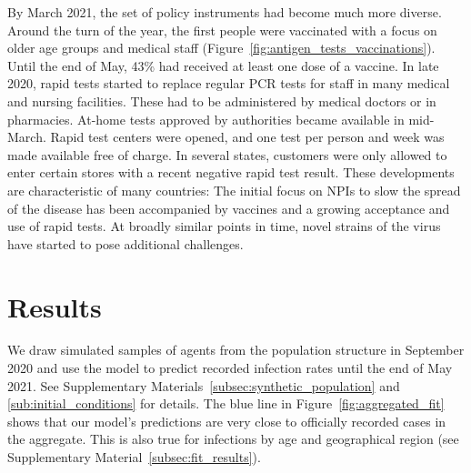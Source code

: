 \begin{figure}[!tp]
\end{figure}

By March 2021, the set of policy instruments had become much more diverse. Around the
turn of the year, the first people were vaccinated with a focus on older age groups and
medical staff (Figure~\ref{fig:antigen_tests_vaccinations}). Until the end of May, 43\%
had received at least one dose of a vaccine. In late 2020, rapid tests started to
replace regular PCR tests for staff in many medical and nursing facilities. These had to
be administered by medical doctors or in pharmacies. At-home tests approved by
authorities became available in mid-March. Rapid test centers were opened, and one test
per person and week was made available free of charge. In several states, customers were
only allowed to enter certain stores with a recent negative rapid test result. These
developments are characteristic of many countries: The initial focus on NPIs to slow the
spread of the disease has been accompanied by vaccines and a growing acceptance and use
of rapid tests. At broadly similar points in time, novel strains of the virus have
started to pose additional challenges.

\section{Results}

We draw simulated samples of agents from the population structure in September 2020 and
use the model to predict recorded infection rates until the end of May 2021. See
Supplementary Materials~\ref{subsec:synthetic_population} and
\ref{sub:initial_conditions} for details. The blue line in
Figure~\ref{fig:aggregated_fit} shows that our model's predictions are very close to
officially recorded cases in the aggregate. This is also true for infections by age and
geographical region (see Supplementary Material~\ref{subsec:fit_results}).

